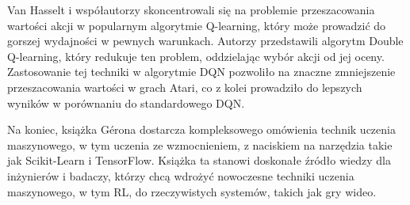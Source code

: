 Van Hasselt i współautorzy \cite{DQ} skoncentrowali się na problemie przeszacowania wartości akcji w popularnym algorytmie Q-learning, który może prowadzić do gorszej wydajności w pewnych warunkach. Autorzy przedstawili algorytm Double Q-learning, który redukuje ten problem, oddzielając wybór akcji od jej oceny. Zastosowanie tej techniki w algorytmie DQN pozwoliło na znaczne zmniejszenie przeszacowania wartości w grach Atari, co z kolei prowadziło do lepszych wyników w porównaniu do standardowego DQN.

Na koniec, książka Gérona \cite{HML} dostarcza kompleksowego omówienia technik uczenia maszynowego, w tym uczenia ze wzmocnieniem, z naciskiem na narzędzia takie jak Scikit-Learn i TensorFlow. Książka ta stanowi doskonałe źródło wiedzy dla inżynierów i badaczy, którzy chcą wdrożyć nowoczesne techniki uczenia maszynowego, w tym RL, do rzeczywistych systemów, takich jak gry wideo.

